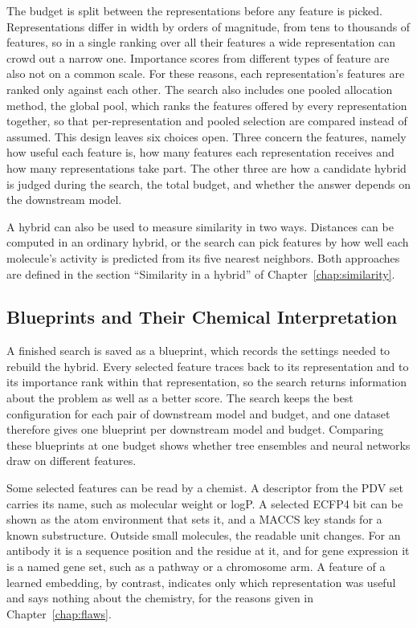 The budget is split between the representations before any feature is picked. Representations differ in width by orders of magnitude, from tens to thousands of features, so in a single ranking over all their features a wide representation can crowd out a narrow one. Importance scores from different types of feature are also not on a common scale. For these reasons, each representation's features are ranked only against each other. The search also includes one pooled allocation method, the global pool, which ranks the features offered by every representation together, so that per-representation and pooled selection are compared instead of assumed. This design leaves six choices open. Three concern the features, namely how useful each feature is, how many features each representation receives and how many representations take part. The other three are how a candidate hybrid is judged during the search, the total budget, and whether the answer depends on the downstream model.

A hybrid can also be used to measure similarity in two ways. Distances can be computed in an ordinary hybrid, or the search can pick features by how well each molecule's activity is predicted from its five nearest neighbors. Both approaches are defined in the section ``Similarity in a hybrid'' of Chapter~\ref{chap:similarity}.


\subsection{Blueprints and Their Chemical Interpretation}

A finished search is saved as a blueprint, which records the settings needed to rebuild the hybrid. Every selected feature traces back to its representation and to its importance rank within that representation, so the search returns information about the problem as well as a better score. The search keeps the best configuration for each pair of downstream model and budget, and one dataset therefore gives one blueprint per downstream model and budget. Comparing these blueprints at one budget shows whether tree ensembles and neural networks draw on different features.

Some selected features can be read by a chemist. A descriptor from the PDV set carries its name, such as molecular weight or logP. A selected ECFP4 bit can be shown as the atom environment that sets it, and a MACCS key stands for a known substructure. Outside small molecules, the readable unit changes. For an antibody it is a sequence position and the residue at it, and for gene expression it is a named gene set, such as a pathway or a chromosome arm. A feature of a learned embedding, by contrast, indicates only which representation was useful and says nothing about the chemistry, for the reasons given in Chapter~\ref{chap:flaws}.

